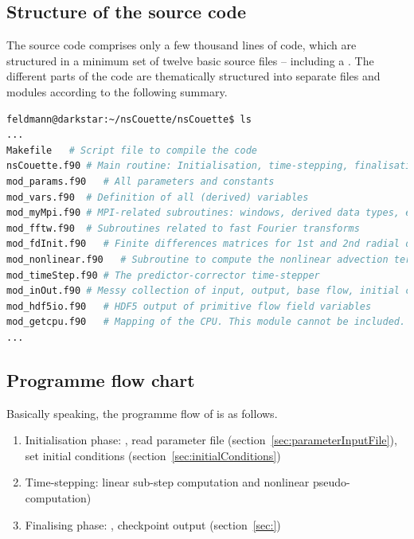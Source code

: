 \documentclass[a4paper, 11pt, DIV=11]{scrartcl}
\begin{document}
\subsection{Structure of the source code}
\label{sec:codeStructures}

The source code comprises only a few thousand lines of code, which are structured in
a minimum set of twelve basic source files -- including a . The different
parts of the code are thematically structured into separate files and \fortran modules
according to the following summary.
\begin{lstlisting}[language=bash]
feldmann@darkstar:~/nsCouette/nsCouette$ ls
...
Makefile   # Script file to compile the code
nsCouette.f90 # Main routine: Initialisation, time-stepping, finalisation
mod_params.f90   # All parameters and constants
mod_vars.f90  # Definition of all (derived) variables
mod_myMpi.f90 # MPI-related subroutines: windows, derived data types, etc.
mod_fftw.f90  # Subroutines related to fast Fourier transforms
mod_fdInit.f90   # Finite differences matrices for 1st and 2nd radial derivatives
mod_nonlinear.f90   # Subroutine to compute the nonlinear advection term (pseudo-spectral) 
mod_timeStep.f90 # The predictor-corrector time-stepper
mod_inOut.f90 # Messy collection of input, output, base flow, initial conditions
mod_hdf5io.f90   # HDF5 output of primitive flow field variables
mod_getcpu.f90   # Mapping of the CPU. This module cannot be included.
...
\end{lstlisting}

\subsection{Programme flow chart}
\label{sec:programmeFlowChart}

Basically speaking, the programme flow of \nsc is as follows.
\begin{enumerate}
\item Initialisation phase: \mpi, read parameter file (section~\ref{sec:parameterInputFile}), set initial conditions (section~\ref{sec:initialConditions}) 
\item Time-stepping: linear sub-step computation and nonlinear pseudo-computation)
\item Finalising phase: \mpi, checkpoint output (section~\ref{sec:})
\end{enumerate}
\end{document}
